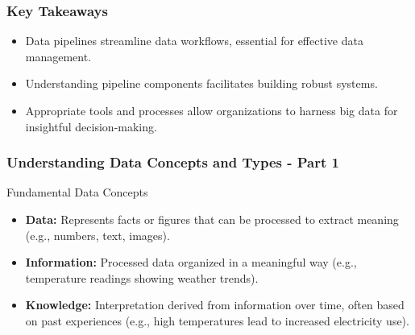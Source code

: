 \documentclass{beamer}
\begin{document}
\begin{frame}[fragile]
    \frametitle{Key Takeaways}
    \begin{itemize}
        \item Data pipelines streamline data workflows, essential for effective data management.
        \item Understanding pipeline components facilitates building robust systems.
        \item Appropriate tools and processes allow organizations to harness big data for insightful decision-making.
    \end{itemize}
\end{frame}

\begin{frame}[fragile]
    \frametitle{Understanding Data Concepts and Types - Part 1}
    \begin{block}{Fundamental Data Concepts}
        \begin{itemize}
            \item \textbf{Data:} Represents facts or figures that can be processed to extract meaning (e.g., numbers, text, images).
            \item \textbf{Information:} Processed data organized in a meaningful way (e.g., temperature readings showing weather trends).
            \item \textbf{Knowledge:} Interpretation derived from information over time, often based on past experiences (e.g., high temperatures lead to increased electricity use).
        \end{itemize}
    \end{block}
\end{frame}
\end{document}
